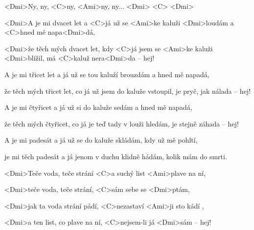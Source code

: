 

\zr
<Dmi>Ny, ny, <C>ny, <Ami>ny, ny... <Dmi> <C> <Dmi>
\kr

\zs
<Dmi>A je mi dvacet let a <C>já už se
<Ami>ke kaluži <Dmi>loudám a <C>hned mě napa<Dmi>dá,

<Dmi>že těch mých dvacet let,
kdy <C>já jsem se <Ami>ke kaluži <Dmi>blížil,
má <C>kaluž nera<Dmi>da -- hej!
\ks

\zr \kr

\zs
A je mi třicet let a já už se
tou kaluží brouzdám a hned mě napadá,

že těch mých třicet let,
co já už jsem do kaluže vstoupil,
je pryč, jak nálada -- hej!
\ks

\zr \kr

\zs
A je mi čtyřicet a já už si
do kaluže sedám a hned mě napadá,

že těch mých čtyřicet,
co já je teď tady v louži hledám,
je stejně záhada -- hej!
\ks

\zr \kr

\zs
A je mi padesát a já už se
do kaluže skládám, kdy už mě pohltí,

je mi těch padesát
a já jenom v duchu klidně hádám,
kolik mám do smrti.
\ks

\zs
<Dmi>Teče voda, teče strání
<C>a suchý list <Ami>plave na ní,

<Dmi>teče voda, teče strání,
<C>sám sebe se <Dmi>ptám,

<Dmi>jak ta voda strání pádí,
<C>nezastaví <Ami>ji sto kádí ,

<Dmi>a ten list, co plave na ní,
<C>nejsem-li já <Dmi>sám -- hej!
\ks

\zr \kr

\kp



